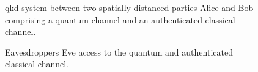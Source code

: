 \begin{figure}[htb]
	\centering
	
	\caption{\Gls{qkd} system between two spatially distanced parties Alice and Bob comprising a quantum channel and an authenticated classical channel.}
\end{figure}

\begin{figure}[htb]
	\centering
	
	\caption{Eavesdroppers Eve access to the quantum and authenticated classical channel.}
\end{figure}